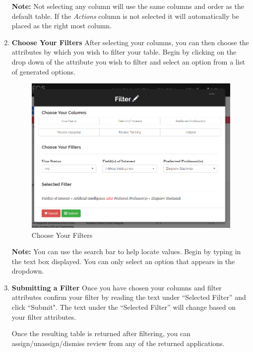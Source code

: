 \documentclass[fontsize=12pt,paper=letter,twoside]{scrartcl}
\begin{document}
\begin{enumerate}
\smallskip
\noindent \textbf{Note:} Not selecting any column will use the same columns and order as the default table. If the \emph{Actions} column is not selected it will automatically be placed as the right most column.

\clearpage
\item \textbf{Choose Your Filters} After selecting your columns, you can then choose the attributes by which you wish to filter your table. Begin by clicking on the drop down of the attribute you wish to filter and select an option from a list of generated options.

\begin{figure}[!htb]
\begin{center}
\includegraphics[width=.99\textwidth]{images/adm/mr/selected_filter.png}
\end{center}
\caption{Choose Your Filters}
\label{fig:adm/choose_filters}
\end{figure} 

\smallskip
\noindent \textbf{Note:} You can use the search bar to help locate values. Begin by typing in the text box displayed. You can only select an option that appears in the dropdown.

\clearpage
\item \textbf{Submitting a Filter} Once you have chosen your columns and filter attributes confirm your filter by reading the text under ``Selected Filter'' and click ``Submit". The text under the ``Selected Filter'' will change based on your filter attributes.

\bigskip
\noindent Once the resulting table is returned after filtering, you can assign/unassign/dismiss review from any of the returned applications.


\end{enumerate}
\end{document}
